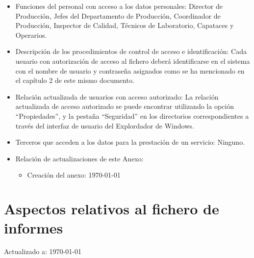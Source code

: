 \documentclass[a4paper,11pt,bibtotoc,noliststotoc]{scrbook}
\begin{document}
\begin{itemize}
\item Funciones del personal con acceso a los datos personales: Director de Producción, Jefes del Departamento de Producción, Coordinador de Producción, Inspector de Calidad, Técnicos de Laboratorio, Capataces y Operarios.

\item Descripción de los procedimientos de control de acceso e identificación: Cada usuario con autorización de acceso al fichero deberá identificarse en el sistema con el nombre de usuario y contraseña asignados como se ha mencionado en el capítulo 2 de este mismo documento.

\item Relación actualizada de usuarios con acceso autorizado:  La relación actualizada de acceso autorizado se puede encontrar utilizando la opción "`Propiedades"', y la pestaña "`Seguridad"' en los directorios correspondientes a través del interfaz de usuario del Explordador de Windows.

\item Terceros que acceden a los datos para la prestación de un servicio: Ninguno.


\item Relación de actualizaciones de este Anexo: 

	\begin{itemize}
	\item Creación del anexo: \today
	\end{itemize}

\end{itemize}








\section{Aspectos relativos al fichero de informes}


Actualizado a: \today
\end{document}
